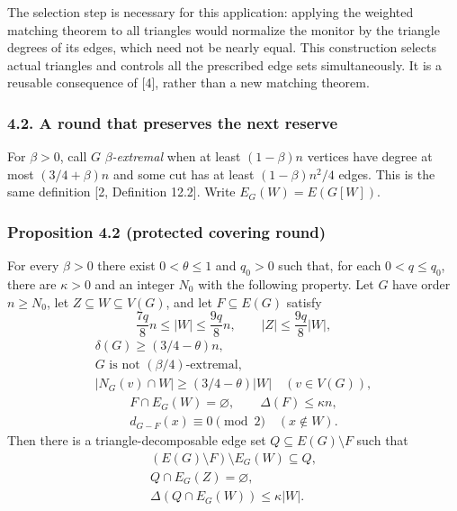 \documentclass[english,11pt,a4paper]{article}
\begin{document}
The selection step is necessary for this application: applying the weighted matching theorem to all triangles would normalize the monitor by the triangle degrees of its edges, which need not be nearly equal. This construction selects actual triangles and controls all the prescribed edge sets simultaneously. It is a reusable consequence of {[}4{]}, rather than a new matching theorem.

\subsubsection{4.2. A round that preserves the next reserve}\label{a-round-that-preserves-the-next-reserve}

For \(\beta>0\), call \(G\) \emph{\(\beta\)-extremal} when at least \((1-\beta)n\) vertices have degree at most \((3/4+\beta)n\) and some cut has at least \((1-\beta)n^2/4\) edges. This is the same definition {[}2, Definition 12.2{]}. Write \(E_G(W)=E(G[W])\).


\subsubsection{Proposition 4.2 (protected covering round)}\label{proposition-4.2-protected-covering-round}

For every \(\beta>0\) there exist \(0<\theta\le1\) and \(q_0>0\) such that, for each \(0<q\le q_0\), there are \(\kappa>0\) and an integer \(N_0\) with the following property. Let \(G\) have order \(n\ge N_0\), let \(Z\subseteq W\subseteq V(G)\), and let \(F\subseteq E(G)\) satisfy \[\frac{7q}{8}n\le|W|\le\frac{9q}{8}n,\qquad |Z|\le\frac{9q}{8}|W|,
\tag{4.4}\] \[\begin{gathered}
\delta(G)\ge(3/4-\theta)n,\\
G\text{ is not }(\beta/4)\text{-extremal},\\
|N_G(v)\cap W|\ge(3/4-\theta)|W|\quad(v\in V(G)),
\end{gathered}
\tag{4.5}\] \[\begin{gathered}
F\cap E_G(W)=\varnothing,\qquad\Delta(F)\le\kappa n,\\
d_{G-F}(x)\equiv0\pmod2\quad(x\notin W).
\end{gathered}
\tag{4.6}\] Then there is a triangle-decomposable edge set \(Q\subseteq E(G)\setminus F\) such that \[\begin{gathered}
(E(G)\setminus F)\setminus E_G(W)\subseteq Q,\\
Q\cap E_G(Z)=\varnothing,\\
\Delta(Q\cap E_G(W))\le\kappa|W|.
\end{gathered}
\tag{4.7}\]
\end{document}
